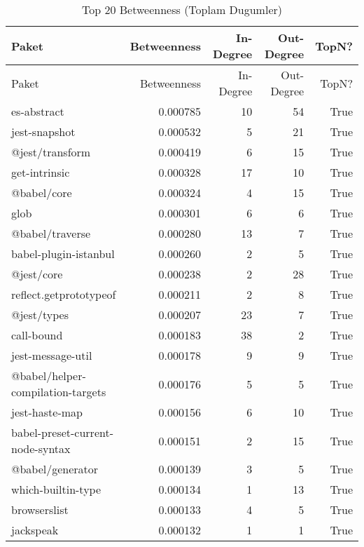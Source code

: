 \begin{longtable}{lrrrr}
\caption{Top 20 Betweenness (Toplam Dugumler)}\\
\toprule
Paket & Betweenness & In-Degree & Out-Degree & TopN? \\
\midrule
\endfirsthead
\toprule
Paket & Betweenness & In-Degree & Out-Degree & TopN? \\
\midrule
\endhead
\bottomrule
\endfoot
\bottomrule
\endlastfoot
es-abstract & 0.000785 & 10 & 54 & True \\
jest-snapshot & 0.000532 & 5 & 21 & True \\
@jest/transform & 0.000419 & 6 & 15 & True \\
get-intrinsic & 0.000328 & 17 & 10 & True \\
@babel/core & 0.000324 & 4 & 15 & True \\
glob & 0.000301 & 6 & 6 & True \\
@babel/traverse & 0.000280 & 13 & 7 & True \\
babel-plugin-istanbul & 0.000260 & 2 & 5 & True \\
@jest/core & 0.000238 & 2 & 28 & True \\
reflect.getprototypeof & 0.000211 & 2 & 8 & True \\
@jest/types & 0.000207 & 23 & 7 & True \\
call-bound & 0.000183 & 38 & 2 & True \\
jest-message-util & 0.000178 & 9 & 9 & True \\
@babel/helper-compilation-targets & 0.000176 & 5 & 5 & True \\
jest-haste-map & 0.000156 & 6 & 10 & True \\
babel-preset-current-node-syntax & 0.000151 & 2 & 15 & True \\
@babel/generator & 0.000139 & 3 & 5 & True \\
which-builtin-type & 0.000134 & 1 & 13 & True \\
browserslist & 0.000133 & 4 & 5 & True \\
jackspeak & 0.000132 & 1 & 1 & True \\
\end{longtable}
